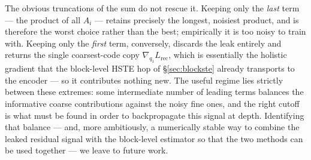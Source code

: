\documentclass[12pt]{report}
\begin{document}
The obvious truncations of the sum do not rescue it. Keeping only the \emph{last} term --- the product of all $A_i$ --- retains precisely the longest, noisiest product, and is therefore the worst choice rather than the best; empirically it is too noisy to train with. Keeping only the \emph{first} term, conversely, discards the leak entirely and returns the single coarsest-code copy $\nabla_{q_1}L_{\text{rec}}$, which is essentially the holistic gradient that the block-level HSTE hop of \S\ref{sec:blockste} already transports to the encoder --- so it contributes nothing new. The useful regime lies strictly between these extremes: some intermediate number of leading terms balances the informative coarse contributions against the noisy fine ones, and the right cutoff is what must be found in order to backpropagate this signal at depth. Identifying that balance --- and, more ambitiously, a numerically stable way to combine the leaked residual signal with the block-level estimator so that the two methods can be used together --- we leave to future work.



\end{document}
